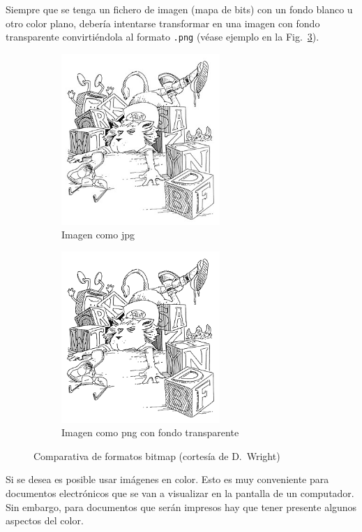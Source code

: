 \documentclass[11pt,a4paper]{article}
\begin{document}
Siempre que se tenga un fichero de imagen (mapa de bits) con un fondo blanco u otro color plano, debería intentarse transformar en una imagen con fondo transparente convirtiéndola al formato \texttt{.png} (véase ejemplo en la Fig.~\ref{fig:lion}).


\begin{figure}[hbt]
	\centering
  	\begin{subfigure}[b]{0.4\linewidth}
  		\centering
		\includegraphics[width=6cm]{lionL.jpg}
		\caption{Imagen como jpg}\label{fig:lionLjpg}
  	\end{subfigure}
  	\begin{subfigure}[b]{0.4\linewidth}
  		\centering
		\includegraphics[width=6cm]{lionL.png}
		\caption{Imagen como png con fondo transparente}\label{fig:lionpng}
  	\end{subfigure}
  	\caption[Comparación jpg y png con transparencia]{Comparativa de formatos bitmap (cortesía de D.~Wright)}
	\label{fig:lion}
\end{figure}

Si se desea es posible usar imágenes en color. Esto es muy conveniente para documentos electrónicos que se van a visualizar en la pantalla de un computador. Sin embargo, para documentos que serán impresos hay que tener presente algunos aspectos del color. 
\end{document}
